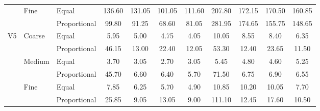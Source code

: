 \documentclass[10pt,journal,cspaper,compsoc,onecolumn]{IEEEtran}
\begin{document}
\begin{table}
\begin{tabular}{|c|l|l|c|c|c|c|c|c|c|c|}
	& Fine	& Equal	& 136.60	& 131.05	& 101.05	& 111.60	& 207.80	& 172.15	& 170.50	& 160.85	\\ \cline{3-11}
	& 	& Proportional	& 99.80	& 91.25	& 68.60	& 81.05	& 281.95	& 174.65	& 155.75	& 148.65	\\ \hline
V5	& Coarse	& Equal	& 5.95	& 5.00	& 4.75	& 4.05	& 10.05	& 8.55	& 8.40	& 6.35	\\ \cline{3-11}
	& 	& Proportional	& 46.15	& 13.00	& 22.40	& 12.05	& 53.30	& 12.40	& 23.65	& 11.50	\\ \cline{2-11}
	& Medium	& Equal	& 3.70	& 3.05	& 2.70	& 3.05	& 5.45	& 4.80	& 4.60	& 5.25	\\ \cline{3-11}
	& 	& Proportional	& 45.70	& 6.60	& 6.40	& 5.70	& 71.50	& 6.75	& 6.90	& 6.55	\\ \cline{2-11}
	& Fine	& Equal	& 7.85	& 6.25	& 5.70	& 4.90	& 10.85	& 10.20	& 10.05	& 7.70	\\ \cline{3-11}
	& 	& Proportional	& 25.85	& 9.05	& 13.05	& 9.00	& 111.10	& 12.45	& 17.60	& 10.50	\\ \hline
\end{tabular}
\end{table}
\end{document}
